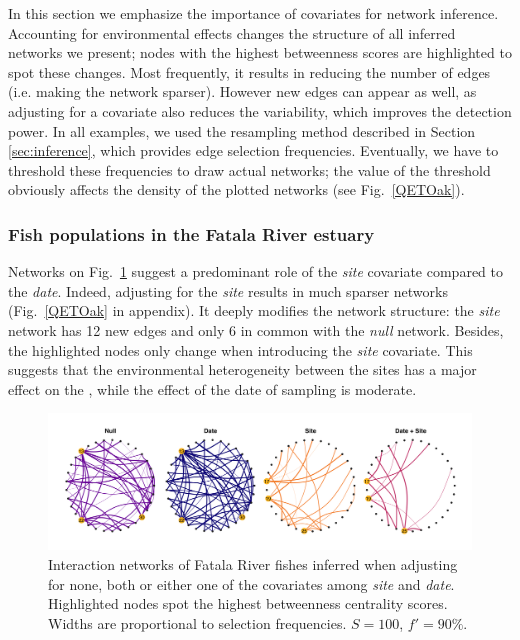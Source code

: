 In this section we emphasize the importance of covariates for network inference. Accounting for environmental effects changes the structure of all inferred networks we present; nodes with the highest betweenness scores are highlighted to spot these changes. Most frequently, it results in reducing the number of edges (i.e. making the network sparser). However new edges can appear as well, as adjusting for a covariate also reduces the variability, which improves the detection power. In all examples, we used the resampling method described in Section \ref{sec:inference}, which provides edge selection frequencies. Eventually, we have to threshold these frequencies to draw actual networks; the value of the threshold obviously affects the density of the plotted networks (see Fig.~\ref{QETOak}). 


\subsubsection{Fish populations in the Fatala River estuary}
\label{barans}

Networks on Fig.~\ref{baransNets} suggest a predominant role of the \textit{site} covariate compared to the \textit{date}. Indeed, adjusting for the \textit{site} results in much sparser networks (Fig.~\ref{QETOak} in appendix). It deeply modifies the network structure: the \textit{site} network has 12 new edges and only 6 in common with the \textit{null} network. Besides, the  highlighted nodes only change when introducing the \textit{site} covariate.  This suggests that the environmental heterogeneity between the sites has a major effect on the , while the effect of the date of sampling is moderate.



  \begin{figure}[H]
      \includegraphics[width=\linewidth]{figs/BaransNets.png}
      \caption{Interaction networks of Fatala River fishes inferred when adjusting for none, both or either one of the covariates among \textit{site} and \textit{date}. Highlighted nodes spot the highest betweenness centrality scores. Widths are proportional to selection frequencies. $S=100$, $f'=90\%$. }
    \label{baransNets}
  \end{figure}
  

